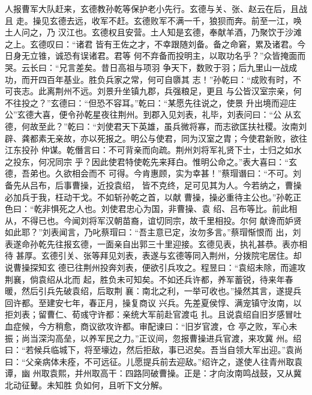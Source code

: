 人报曹军大队赶来，玄德教孙乾等保护老小先行。玄德与关、张、赵云在后，且战且
走。操见玄德去远，收军不赶。玄德败军不满一千，狼狈而奔。前至一江，唤土人问之，乃
汉江也。玄德权且安营。土人知是玄德，奉献羊酒，乃聚饮于沙滩之上。玄德叹曰：“诸君
皆有王佐之才，不幸跟随刘备。备之命窘，累及诸君。今日身无立锥，诚恐有误诸君。君等
何不弃备而投明主，以取功名乎？”众皆掩面而哭。云长曰：“兄言差矣。昔日高祖与项羽
争天下，数败于羽；后九里山一战成功，而开四百年基业。胜负兵家之常，何可自隳其
志！”孙乾曰：“成败有时，不可丧志。此离荆州不远。刘景升坐镇九郡，兵强粮足，更且
与公皆汉室宗亲，何不往投之？”玄德曰：“但恐不容耳。”乾曰：“某愿先往说之，使景
升出境而迎庄公”玄德大喜，便令孙乾星夜往荆州。到郡入见刘表，礼毕，刘表问曰：“公
从玄德，何故至此？”乾曰：“刘使君天下英雄，虽兵微将寡，而志欲匡扶社稷。汝南刘
辟、龚都素无亲故，亦以死报之。明公与使君，同为汉室之胄；今使君新败，欲往江东投孙
仲谋。乾僭言曰：不可背亲而向疏。荆州刘将军礼贤下士，士归之如水之投东，何况同宗
乎？因此使君特使乾先来拜白。惟明公命之。”表大喜曰：“玄德，吾弟也。久欲相会而不
可得。今肯惠顾，实为幸甚！”蔡瑁谮曰：“不可。刘备先从吕布，后事曹操，近投袁绍，
皆不克终，足可见其为人。今若纳之，曹操必加兵于我，枉动干戈。不如斩孙乾之首，以献
曹操，操必重待主公也。”孙乾正色曰：“乾非惧死之人也。刘使君忠心为国，非曹操、袁
绍、吕布等比。前此相从，不得已也。今闻刘将军汉朝苗裔，谊切同宗，故千里相投。尔何
献谗而妒贤如此耶？”刘表闻言，乃叱蔡瑁曰：“吾主意已定，汝勿多言。”蔡瑁惭恨而
出，刘表遂命孙乾先往报玄德，一面亲自出郭三十里迎接。玄德见表，执礼甚恭。表亦相待
甚厚。玄德引关、张等拜见刘表，表遂与玄德等同入荆州，分拨院宅居住。却说曹操探知玄
德已往荆州投奔刘表，便欲引兵攻之。程昱曰：“袁绍未除，而遽攻荆襄，倘袁绍从北而
起，胜负未可知矣。不如还兵许都，养军蓄锐，待来年春暖，然后引兵先破袁绍，后取荆
襄：南北之利，一举可收也。”操然其言，遂提兵回许都。至建安七年，春正月，操复商议
兴兵。先差夏侯惇、满宠镇守汝南，以拒刘表；留曹仁、荀彧守许都：亲统大军前赴官渡屯
扎。且说袁绍自旧岁感冒吐血症候，今方稍愈，商议欲攻许都。审配谏曰：“旧岁官渡，仓
亭之败，军心未振；尚当深沟高垒，以养军民之力。”正议间，忽报曹操进兵官渡，来攻冀
州。绍曰：“若候兵临城下，将至壕边，然后拒敌，事已迟矣。吾当自领大军出迎。”袁尚
曰：“父亲病体未痊，不可远征。儿愿提兵前去迎敌。”绍许之，遂使人往青州取袁谭，幽
州取袁熙，并州取高干：四路同破曹操。正是：才向汝南鸣战鼓，又从冀北动征鼙。未知胜
负如何，且听下文分解。